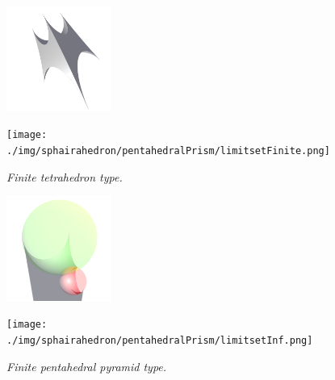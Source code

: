 \documentclass[dvipdfmx]{interact}
\theoremstyle{plain}%
\theoremstyle{definition}
\theoremstyle{remark}
\theoremstyle{problemstyle}
\begin{document}
\begin{figure}[H]
 \begin{minipage}{0.5\textwidth}
  \begin{minipage}[t]{0.24\textwidth}
   \centering
   \includegraphics[width=1.35in, height=1.35in, keepaspectratio]{./img/sphairahedron/pentahedralPrism/sphairahedronFinite.png}
  \end{minipage}
  \hspace*{\fill}
  \begin{minipage}[t]{0.24\textwidth}
   \centering
   \texttt{[image: ./img/sphairahedron/pentahedralPrism/limitsetFinite.png]}
  \end{minipage}
  \hspace*{\fill}
  \caption{\textit{Finite tetrahedron type.}}
  \label{fig:pentahedralPyramidFinite}
 \end{minipage}
 \hspace*{\fill}
 \begin{minipage}{0.5\textwidth}
  \begin{minipage}[t]{0.24\textwidth}
   \centering
   \includegraphics[width=1.35in, height=1.35in, keepaspectratio]{./img/sphairahedron/pentahedralPrism/sphairahedronInf.png}
  \end{minipage}
  \hspace*{\fill}
  \begin{minipage}[t]{0.24\textwidth}
   \centering
   \texttt{[image: ./img/sphairahedron/pentahedralPrism/limitsetInf.png]}
  \end{minipage}
  \hspace*{\fill}
  \caption{\textit{Finite pentahedral pyramid type.}}
  \label{fig:pentahedralPyramidInf}
 \end{minipage}
\end{figure}
\end{document}
